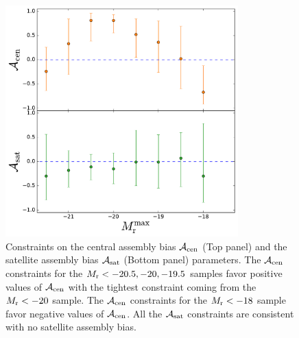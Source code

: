 \documentclass[12pt, preprint]{aastex}
\newcommand{\acen}{\mathcal{A}_{\rm cen}}
\newcommand{\asat}{\mathcal{A}_{\rm sat}}
\begin{document}
\clearpage


\begin{figure}[p]~\\
\begin{center}
\includegraphics[width=0.8\textwidth]{bias2.pdf}
\caption{Constraints on the central assembly bias $\acen$ (Top panel) and the satellite assembly bias $\asat$ (Bottom panel) parameters. The $\acen$ constraints for the $M_{\rm r} < -20.5, -20, -19.5$ samples favor positive values of $\acen$ with the tightest constraint coming from the $M_{\rm r} < -20$ sample. The $\acen$ constraints for the $M_{\rm r}<-18$ sample favor negative values of $\acen$. All the $\asat$ constraints are consistent with no satellite assembly bias.}
\label{fig:bias}
\end{center}
\end{figure}

\clearpage
\end{document}
